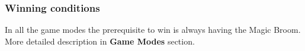 \subsubsection{Winning conditions}
In all the game modes the prerequisite to win is always having the Magic Broom. More detailed description in \textbf{Game Modes} section.\\
